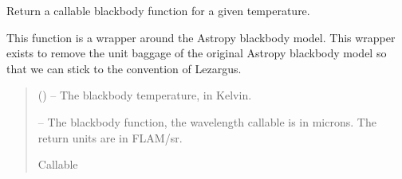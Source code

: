 \documentclass[letterpaper,11pt,english]{sphinxmanual}
\begin{document}
\begin{savenotes}\begin{fulllineitems}
\label{\detokenize{code/lezargus.library.wrapper:lezargus.library.wrapper.blackbody_function}}
\pysigstartsignatures
{}
\pysigstopsignatures
\sphinxAtStartPar
Return a callable blackbody function for a given temperature.

\sphinxAtStartPar
This function is a wrapper around the Astropy blackbody model. This wrapper
exists to remove the unit baggage of the original Astropy blackbody
model so that we can stick to the convention of Lezargus.
\begin{quote}\begin{description}
\sphinxAtStartPar
{} () – The blackbody temperature, in Kelvin.

\sphinxAtStartPar
{} – The blackbody function, the wavelength callable is in microns. The
return units are in FLAM/sr.

\sphinxAtStartPar
Callable

\end{description}\end{quote}

\end{fulllineitems}\end{savenotes}
\end{document}
